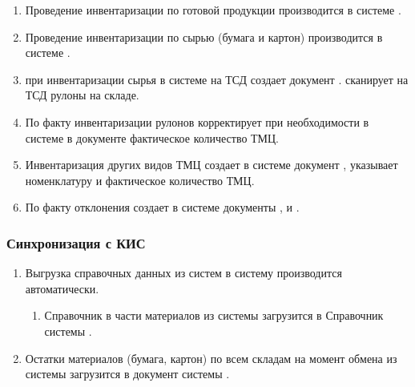 \begin{enumerate}
\item Проведение инвентаризации по готовой продукции производится в системе \erp. 
\item Проведение инвентаризации по сырью (бумага и картон) производится в системе \erp. \item	\kladovshik при инвентаризации сырья в системе \erp на ТСД создает документ . \kladovshik сканирует на ТСД рулоны на складе. 

\item	По факту инвентаризации рулонов \kladovshik корректирует при необходимости в системе \erp в документе  фактическое количество ТМЦ.
\item	Инвентаризация других видов ТМЦ \kladovshik создает в системе \erp документ , указывает номенклатуру и фактическое количество ТМЦ.
\item	По факту отклонения \kladovshik создает в системе документы ,  и .

\end{enumerate}


\subsubsection{Синхронизация с КИС}
\label{bp:storege_integration}

\begin{enumerate}
\item Выгрузка справочных данных из систем \erp в систему \gofro производится автоматически.

\begin{enumerate}
\item
Справочник   в части материалов из системы \erp загрузится в Справочник   системы \gofro.
\end{enumerate}

\item 	

 Остатки материалов (бумага, картон) по всем складам на момент обмена из системы \erp загрузится в документ   системы \gofro.
\end{enumerate}

